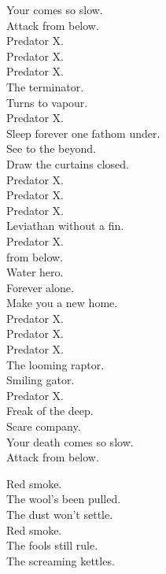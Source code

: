 Your  comes so slow. \\
Attack from below. \\

Predator X. \\
Predator X. \\
Predator X. \\
The terminator. \\
Turns to vapour. \\
Predator X. \\
Sleep forever one fathom under. \\

See to the beyond. \\
Draw the curtains closed. \\

Predator X. \\
Predator X. \\
Predator X. \\
Leviathan without a fin. \\
Predator X. \\
 from below. \\
Water hero. \\

Forever alone. \\
Make you a new home. \\

Predator X. \\
Predator X. \\
Predator X. \\
The looming raptor. \\
Smiling gator. \\
Predator X. \\
Freak of the deep. \\
Scare company. \\

Your death comes so slow. \\
Attack from below. \\




Red smoke. \\
The wool's been pulled. \\
The dust won't settle. \\
Red smoke. \\
The fools still rule. \\
The screaming kettles. \\

